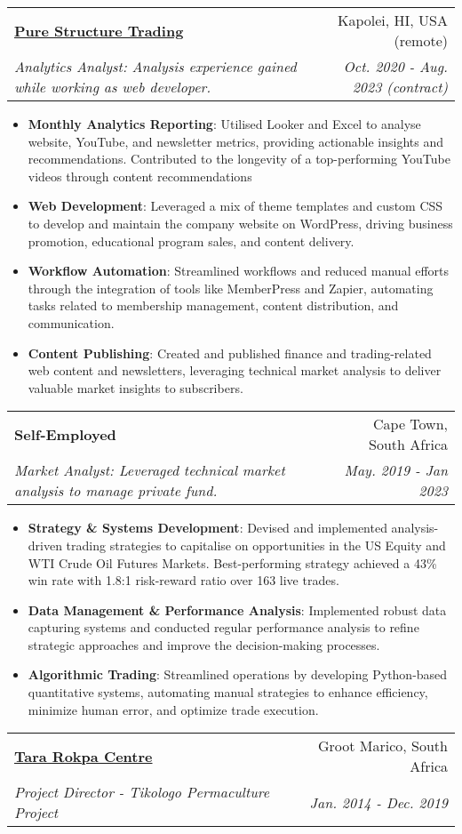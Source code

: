 \documentclass[a4paper,11pt]{article}
\makeatletter
\newcommand{\resumeItem}[2]{
  \item\small{
    \textbf{#1}{: #2 \vspace{-2pt}}
  }
}
\newcommand{\resumeSubheading}[4]{
  \vspace{-1pt}\item
    \begin{tabular*}{0.97\textwidth}[t]{l@{\extracolsep{\fill}}r}
      \textbf{#1} & #2 \\
      \textit{\small#3} & \textit{\small #4} \\
  \end{tabular*}\vspace{-10pt}
}
\newcommand{\resumeItemListStart}{\begin{itemize}}
\newcommand{\resumeItemListEnd}{\end{itemize}\vspace{-10pt}}
\makeatother
\begin{document}
    \resumeSubheading
      {\href{http://purestructuretrading.com/education}{Pure Structure Trading }}{Kapolei, HI, USA (remote)}
      {Analytics Analyst: Analysis experience gained while working as web developer.}{Oct. 2020 - Aug. 2023 (contract)}
      
      \resumeItemListStart
        \resumeItem{Monthly Analytics Reporting}
          {Utilised Looker and Excel to analyse website, YouTube, and newsletter metrics, providing actionable insights and recommendations. Contributed to the longevity of a top-performing YouTube videos through content recommendations}
        \resumeItem{Web Development}
          {Leveraged a mix of theme templates and custom CSS to develop and maintain the company website on WordPress, driving business promotion, educational program sales, and content delivery.}
        \resumeItem{Workflow Automation}
          {Streamlined workflows and reduced manual efforts through the integration of tools like MemberPress and Zapier, automating tasks related to membership management, content distribution, and communication.}
        \resumeItem{Content Publishing}
          {Created and published finance and trading-related web content and newsletters, leveraging technical market analysis to deliver valuable market insights to subscribers.}
      \resumeItemListEnd

    \resumeSubheading
      {Self-Employed}{Cape Town, South Africa}
      {Market Analyst: Leveraged technical market analysis to manage private fund.}{May. 2019 - Jan 2023}
      
      \resumeItemListStart
        \resumeItem{Strategy \& Systems Development}
          {Devised and implemented analysis-driven trading strategies to capitalise on opportunities in the US Equity and WTI Crude Oil Futures Markets. Best-performing strategy achieved a 43\% win rate with 1.8:1 risk-reward ratio over 163 live trades.}
        \resumeItem{Data Management \& Performance Analysis}
          {Implemented robust data capturing systems and conducted regular performance analysis to refine strategic approaches and improve the decision-making processes.}
        \resumeItem{Algorithmic Trading}
          {Streamlined operations by developing Python-based quantitative systems, automating manual strategies to enhance efficiency, minimize human error, and optimize trade execution.}
      \resumeItemListEnd

    \resumeSubheading
      {\href{https://tararokpacentre.co.za/about-tikologo/}{Tara Rokpa Centre}}{Groot Marico, South Africa}
      {Project Director - Tikologo Permaculture Project}{Jan. 2014 - Dec. 2019}
      
\end{document}
